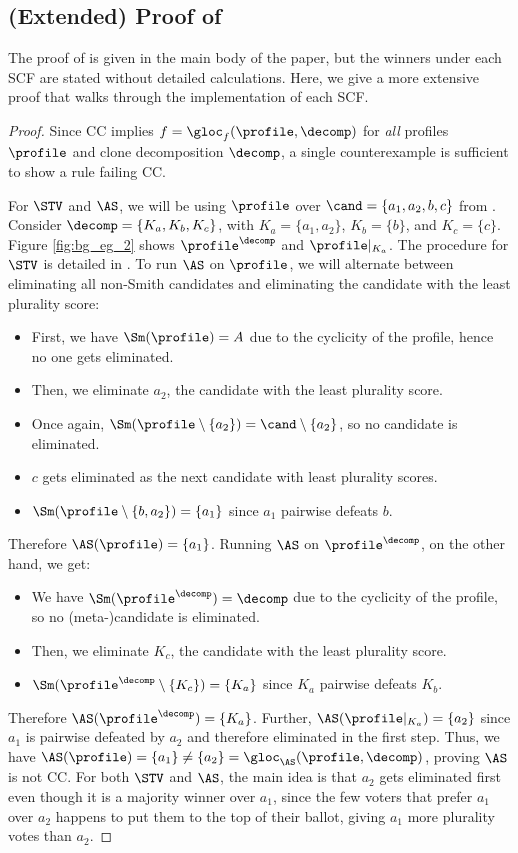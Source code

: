\subsection{(Extended) Proof of }\label{appsec:extended_ioc}

The proof of  is given in the main body of the paper, but the winners under each SCF are stated without detailed calculations. Here, we give a more extensive proof that walks through the implementation of each SCF.

\ccfails*
\begin{proof}
Since CC implies $f=\gloc_f(\profile, \decomp)$ for \textit{all} profiles $\profile$ and clone decomposition $\decomp$, a single counterexample is sufficient to show a rule failing CC.

For $\STV$ and $\AS$, we will be using $\profile$ over $\cand = \{a_1,a_2,b,c\}$ from . Consider $\decomp=\{K_a,K_b,K_c\}$, with $K_a=\{a_1,a_2\}$, $K_b=\{b\}$, and $K_c=\{c\}$. Figure \ref{fig:bg_eg_2} shows $\profile^\decomp$ and $\profile|_{K_a}$. The procedure for $\STV$ is detailed in . To run $\AS$ on $\profile$, we will alternate between eliminating all non-Smith candidates and eliminating the candidate with the least plurality score:
\begin{itemize}
    \item First, we have $\Sm(\profile)=A$ due to the cyclicity of the profile, hence no one gets eliminated.
    \item Then, we eliminate $a_2$, the candidate with the least plurality score.
    \item Once again, $\Sm(\profile \setminus\{a_2\})=\cand \setminus\{a_2\}$, so no candidate is eliminated.
    \item $c$ gets eliminated as the next candidate with least plurality scores.
    \item $\Sm(\profile\setminus\{b,a_2\})=\{a_1\}$ since $a_1$ pairwise defeats $b$.
\end{itemize}
Therefore $\AS(\profile)=\{a_1\}$. Running $\AS$ on $\profile^\decomp$, on the other hand, we get:
\begin{itemize}
    \item We have $\Sm(\profile^\decomp)=\decomp$ due to the cyclicity of the profile, so no (meta-)candidate is eliminated.
    \item Then, we eliminate $K_c$, the candidate with the least plurality score.
    \item $\Sm(\profile^\decomp \setminus\{K_c\})=\{K_a\}$ since $K_a$ pairwise defeats $K_b$.
\end{itemize}
Therefore $\AS(\profile^\decomp)=\{K_a\}$. Further, $\AS(\profile|_{K_a})=\{a_2\}$ since $a_1$ is pairwise defeated by $a_2$ and therefore eliminated in the first step. Thus, we have $\AS(\profile)=\{a_1\} \neq \{a_2\} = \gloc_{\AS}(\profile,\decomp)$, proving $\AS$ is not CC. For both $\STV$ and $\AS$, the main idea is that $a_2$ gets eliminated first even though it is a majority winner over $a_1$, since the few voters that prefer $a_1$ over $a_2$ happens to put them to the top of their ballot, giving $a_1$ more plurality votes than $a_2$. 



\end{proof}
